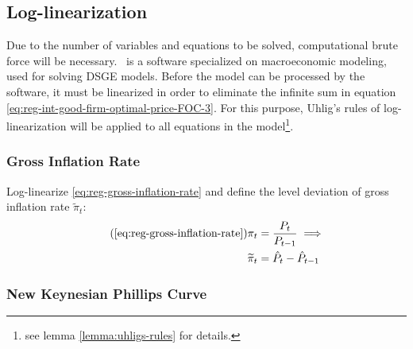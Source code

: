 \documentclass[
	thesis.tex
	]{subfiles}
\begin{document}


\subsection{Log-linearization}

Due to the number of variables and equations to be solved, computational brute force will be necessary. \dynare \ is a software specialized on macroeconomic modeling, used for solving DSGE models. Before the model can be processed by the software, it must be linearized in order to eliminate the infinite sum in equation \ref{eq:reg-int-good-firm-optimal-price-FOC-3}. For this purpose, Uhlig's rules of log-linearization \cite{uhlig_toolkit_1999} will be applied to all equations in the model\footnote{see lemma \ref{lemma:uhligs-rules} for details.}.


\subsubsection{Gross Inflation Rate}

Log-linearize \ref{eq:reg-gross-inflation-rate} and define the level deviation of gross inflation rate $\widetilde{\pi}_t$:
\begin{align}
	\tag{\ref{eq:reg-gross-inflation-rate}}
	\pi_t &= \frac{P_t}{P_{t-1}} \implies \\
	\widetilde{\pi}_t &= \hat{P}_t - \hat{P}_{t-1}
	\label{eq:reg-level-dev-gross-inflation-rate}
\end{align}


\subsubsection{New Keynesian Phillips Curve}
\end{document}
